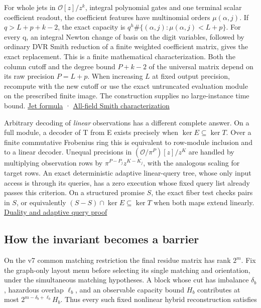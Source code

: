 \documentclass[11pt,a4paper]{article}
\begin{document}
For whole jets in \(\mathcal O[z]/z^k\), integral polynomial gates and
one terminal scalar coefficient readout, the coefficient features have
multinomial orders \(\mu(\alpha,j)\). If \(q>L+p+k-2\), the exact
capacity is \(q^h\#\{(\alpha,j):\mu(\alpha,j)<L+p\}\). For every q, an
integral Newton change of basis on the digit variables, followed by
ordinary DVR Smith reduction of a finite weighted coefficient matrix,
gives the exact replacement. This is a finite mathematical
characterization. Both the column cutoff and the degree bound \(P+k-2\)
of the universal matrix depend on its raw precision \(P=L+p\). When
increasing \(L\) at fixed output precision, recompute with the new
cutoff or use the exact untruncated evaluation module on the prescribed
finite image. The construction supplies no large-instance time bound.
\hyperref[v8-section-jet-polynomial-capacity]{Jet formula} ·
\hyperref[v8-section-jet-newton-smith]{All-field Smith characterization}

Arbitrary decoding of \emph{linear} observations has a different
complete answer. On a full module, a decoder of T from E exists
precisely when \(\ker E\subseteq\ker T\). Over a finite commutative
Frobenius ring this is equivalent to row-module inclusion and to a
linear decoder. Unequal precisions in \((\mathcal O/\pi^P)[z]/z^K\) are
handled by multiplying observation rows by \(\pi^{P-P_j}z^{K-K_j}\),
with the analogous scaling for target rows. An exact deterministic
adaptive linear-query tree, whose only input access is through its
queries, has a zero execution whose fixed query list already passes this
criterion. On a structured promise \(S\), the exact fiber test checks
pairs in \(S\), or equivalently \((S-S)\cap\ker E\subseteq\ker T\) when
both maps extend linearly. \hyperref[v8-section-duality-typeset]{Duality
and adaptive query proof}

\subsection{How the invariant becomes a
barrier}\label{v8-how-the-invariant-becomes-a-barrier}

On the v7 common matching restriction the final residue matrix has rank
\(2^m\). Fix the graph-only layout menu before selecting its single
matching and orientation, under the simultaneous matching hypotheses. A
block whose cut has imbalance \(\delta_b\), hazardous overlap
\(\ell_b\), and an observable capacity bound \(H_b\) contributes at most
\(2^{m-\delta_b+\ell_b}H_b\). Thus every such fixed nonlinear hybrid
reconstruction satisfies
\end{document}
